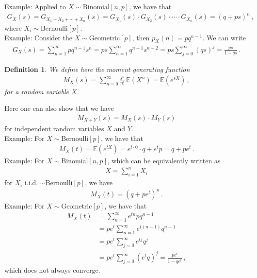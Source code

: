 \documentclass[11pt, onesided]{book}
\theoremstyle{break}
\theoremstyle{break}
\newtheorem{defn}{Definition}[thm]
\newcommand{\example}{\color{green}Example: \color{black}}
\begin{document}
\example Applied to $X \sim \text{Binomial}[n,p]$, we have that
\begin{align*}
G_X(s) = G_{X_1 + X_2+\cdots+X_n}(s) = G_{X_1}(s) \cdot G_{X_2}(s) \cdot \cdots \cdot G_{X_n}(s) = (q+ps)^n\,,
\end{align*}
where $X_i \sim \text{Bernoulli}[p]$.\\

\example Consider the $X \sim \text{Geometric}[p]$, then $p_X(n) = pq^{n-1}$. We can write
\begin{align*}
G_X(s) = \sum_{n=1}^\infty pq^{n-1}s^n = p s \sum_{n=1}^\infty q^{n-1}s^{n-2} = ps \sum_{j=0}^\infty (qs)^j = \frac{ps}{1- qs}\,.
\end{align*}

\begin{defn}
We define here the moment generating function
\begin{align*}
M_X(s) = \sum_{n=0}^\infty \frac{s^n}{n!} \,\mathbb{E}(X^n) = \mathbb{E}(e^{sX})\,,
\end{align*}
for a random variable $X$.
\end{defn}
Here one can also show that we have
\begin{align*}
M_{X+Y}(s) = M_X(s) \cdot M_Y(s)
\end{align*}
for independent random variables $X$ and $Y$. \\

\example For $X\sim$Bernoulli$[p]$, we have that
\begin{align*}
M_X(t) = \mathbb{E}(e^{tX}) = e^{t\cdot 0}\cdot q + e^{t} p = q+pe^t\,.
\end{align*}
\example For $X\sim$Binomial$[n,p]$, which can be equivalently written as 
\begin{align*}
X = \sum_{i=1}^n X_i
\end{align*}
for $X_i $ i.i.d. $\sim$Bernoulli$[p]$, we have
\begin{align*}
M_X(t) = (q + pe^t)^n\,.
\end{align*}
\example For $X \sim$Geometric$[p]$, we have that
\begin{align*}
M_X(t) 
&= \sum_{n=1}^\infty e^{tn}pq^{n-1} \\
&=pe^t \sum_{n=1}^\infty e^{t(n-1)}q^{n-1} \\
&= pe^t  \sum_{j=0}^\infty e^{tj}q^j \\
&= pe^t \sum_{j=0}^\infty (e^t q)^j = \frac{pe^t}{1-qe^t}\,,
\end{align*}
which does not always converge.\\
\end{document}
